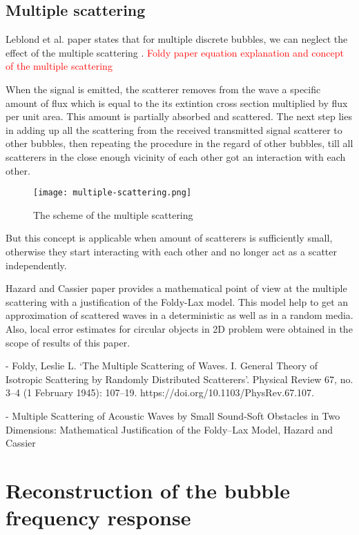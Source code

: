 
\subsection{Multiple scattering }

Leblond et al. paper states that for multiple discrete bubbles, we can neglect the effect of the multiple scattering \cite[]{leblond_acoustic_2014}. 
\textcolor{red}{Foldy paper equation explanation and concept of the multiple scattering}

When the signal is emitted, the scatterer removes from the wave a specific amount of flux which is equal to the its extintion cross section multiplied by flux per unit area. This amount is partially absorbed and scattered. The next step lies in adding up all the scattering from the received transmitted signal scatterer to other bubbles, then repeating the procedure in the regard of other bubbles, till all scatterers in the close enough vicinity of each other got an interaction with each other.

\begin{figure}[H]
    \centering
    \texttt{[image: multiple-scattering.png]}
    \caption*{The scheme of the multiple scattering}
    \label{fig:multiple-scattering}
\end{figure}

But this concept is applicable when amount of scatterers is sufficiently small, otherwise they start interacting with each other and no longer act as a scatter independently. %

Hazard and Cassier paper provides a mathematical point of view at the multiple scattering with a justification of the Foldy-Lax model. This model help to get an approximation of scattered waves in a deterministic as well as in a random media. Also, local error estimates for circular objects in 2D problem were obtained in the scope of results of this paper.

- Foldy, Leslie L. ‘The Multiple Scattering of Waves. I. General Theory of Isotropic Scattering by Randomly Distributed Scatterers’. Physical Review 67, no. 3–4 (1 February 1945): 107–19. https://doi.org/10.1103/PhysRev.67.107.

- Multiple Scattering of Acoustic Waves by Small Sound-Soft Obstacles in Two Dimensions: Mathematical Justification of the Foldy–Lax Model, Hazard and Cassier

\section{Reconstruction of the bubble frequency response}

